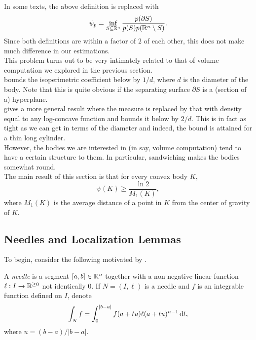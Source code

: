 \documentclass{article}
\begin{document}
		In some texts, the above definition is replaced with
		\[ \psi_p = \inf_{S\subseteq\mathbb{R}^n} \frac{p(\partial S)}{p(S)p(\mathbb{R}^n\setminus S)}. \]
		Since both definitions are within a factor of $2$ of each other, this does not make much difference in our estimations.\\

		This problem turns out to be very intimately related to that of volume computation we explored in the previous section.\\
		\cite{lovasz-simonovits-mixing-rate-isoperimetric} bounds the isoperimetric coefficient below by $1/d$, where $d$ is the diameter of the body. Note that this is quite obvious if the separating surface $\partial S$ is a (section of a) hyperplane.\\
		\cite{applegate-kannan-cube-sandwich} gives a more general result where the measure is replaced by that with density equal to any log-concave function and bounds it below by $2/d$. This is in fact as tight as we can get in terms of the diameter and indeed, the bound is attained for a thin long cylinder.\\
		However, the bodies we are interested in (in say, volume computation) tend to have a certain structure to them. In particular, sandwiching makes the bodies somewhat round.\\
		The main result of this section is that for every convex body $K$,
		\[ \psi(K) \geq \frac{\ln 2}{M_1(K)}, \]
		where $M_1(K)$ is the average distance of a point in $K$ from the center of gravity of $K$. 

	\subsection{Needles and Localization Lemmas}
	\label{sec: 5.1.2}

		To begin, consider the following motivated by .

		\begin{definition}
			A \textit{needle} is a segment $[a,b]\in\mathbb{R}^n$ together with a non-negative linear function $\ell:I\to\mathbb{R}^{\geq 0}$ not identically $0$. If $N=(I,\ell)$ is a needle and $f$ is an integrable function defined on $I$, denote
			\[ \int_N f = \int_{0}^{|b-a|} f(a+tu)\ell(a+tu)^{n-1} \operatorname{d}\!{t}, \]
			where $u=(b-a)/|b-a|$.
		\end{definition}
\end{document}
